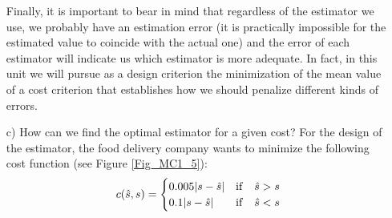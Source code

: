 \begin{solution}
\begin{itemize}
Finally, it is important to bear in mind that regardless of the estimator we use, we probably have an estimation error (it is practically impossible for the estimated value to coincide with the actual one) and the error of each estimator will indicate us which estimator is more adequate. %
In fact, in this unit we will pursue as a design criterion the minimization of the mean value of a cost criterion that establishes how we should penalize different kinds of errors.

\vspace{0.2cm}
\item[c)] How can we find the optimal estimator for a given cost? 
For the design of the estimator, the food delivery company wants to minimize the following cost function (see Figure \ref{Fig_MC1_5}):
\begin{equation} 
c(\hat{s},s) = \begin{cases}
0.005|s-\hat{s}| & {\rm if} \quad \hat{s}>s\\
0.1|s-\hat{s}|  & {\rm if} \quad \hat{s}<s 
\end{cases} \nonumber
\end{equation} 



\end{itemize}
\end{solution}
